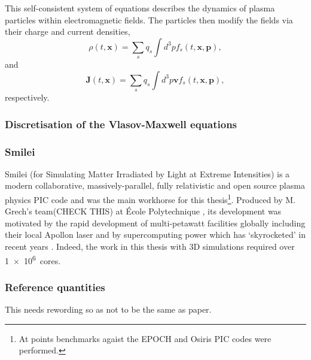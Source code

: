 This self-consistent system of equations describes the dynamics of plasma particles within electromagnetic fields. The particles then modify the fields via their charge and current densities,
\begin{equation}
	\rho(t,\mathbf{x}) = \sum_s q_s \int d^3pf_s(t,\mathbf{x},\mathbf{p}),
\end{equation}
and 
\begin{equation}
	\mathbf{J}(t,\mathbf{x}) = \sum_s q_s \int d^3p\mathbf{v}f_s(t,\mathbf{x},\mathbf{p}),
\end{equation}
respectively.

\subsubsection{Discretisation of the Vlasov-Maxwell equations}





\subsubsection{Smilei}
Smilei (for Simulating Matter Irradiated by Light at Extreme Intensities) is a modern collaborative, massively-parallel, fully relativistic and open source plasma physics PIC code and was the main workhorse for this thesis\footnote{At points benchmarks agaist the EPOCH and Osiris PIC codes were performed.}. Produced by M. Grech's team(CHECK THIS) at École Polytechnique \cite{derouillat_2018_SmileiCollaborativeOpensource}, its development was motivated by the rapid development of multi-petawatt facilities globally including their local Apollon laser and by supercomputing power which has `skyrocketed' in recent years \cite{derouillat_2018_SmileiCollaborativeOpensource}. Indeed, the work in this thesis with 3D simulations required over \qty{1e6}{cores}.


\subsubsection{Reference quantities}
This needs rewording so as not to be the same as paper.

